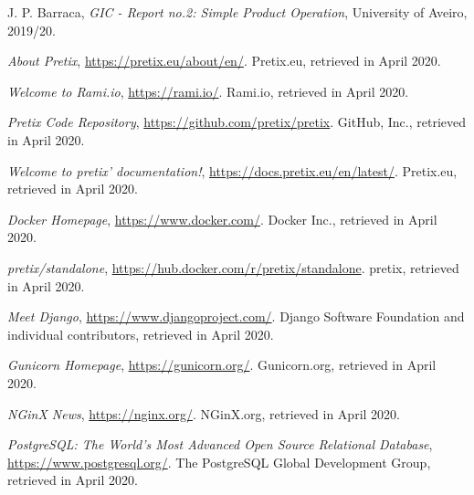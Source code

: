 \documentclass[12pt]{article}
\begin{document}
\newpage
\begin{thebibliography}{9} %
  

  J. P. Barraca,
  \textit{GIC - Report no.2: Simple Product Operation},
  University of Aveiro,
  2019/20.
  \vspace{-10pt}

  \textit{About Pretix},
  \url{https://pretix.eu/about/en/}.
  Pretix.eu,
  retrieved in April 2020.
  \vspace{-10pt}

  \textit{Welcome to Rami.io},
  \url{https://rami.io/}.
  Rami.io,
  retrieved in April 2020.
  \vspace{-10pt}

  \textit{Pretix Code Repository},
  \url{https://github.com/pretix/pretix}.
  GitHub, Inc.,
  retrieved in April 2020.
  \vspace{-10pt}

  \textit{Welcome to pretix' documentation!},
  \url{https://docs.pretix.eu/en/latest/}.
  Pretix.eu,
  retrieved in April 2020.
  \vspace{-10pt}

  \textit{Docker Homepage},
  \url{https://www.docker.com/}.
  Docker Inc.,
  retrieved in April 2020.
  \vspace{-26pt}

  \textit{pretix/standalone},
  \url{https://hub.docker.com/r/pretix/standalone}.
  pretix,
  retrieved in April 2020.
  \vspace{-10pt}

  \textit{Meet Django},
  \url{https://www.djangoproject.com/}.
  Django Software Foundation and individual contributors,
  retrieved in April 2020.
  \vspace{-10pt}

  \textit{Gunicorn Homepage},
  \url{https://gunicorn.org/}.
  Gunicorn.org,
  retrieved in April 2020.
  \vspace{-10pt}

  \textit{NGinX News},
  \url{https://nginx.org/}.
  NGinX.org,
  retrieved in April 2020.
  \vspace{-10pt}

  \textit{PostgreSQL: The World's Most Advanced Open Source Relational Database},
  \url{https://www.postgresql.org/}.
  The PostgreSQL Global Development Group,
  retrieved in April 2020.
  \vspace{-10pt}


\end{thebibliography}
\end{document}
